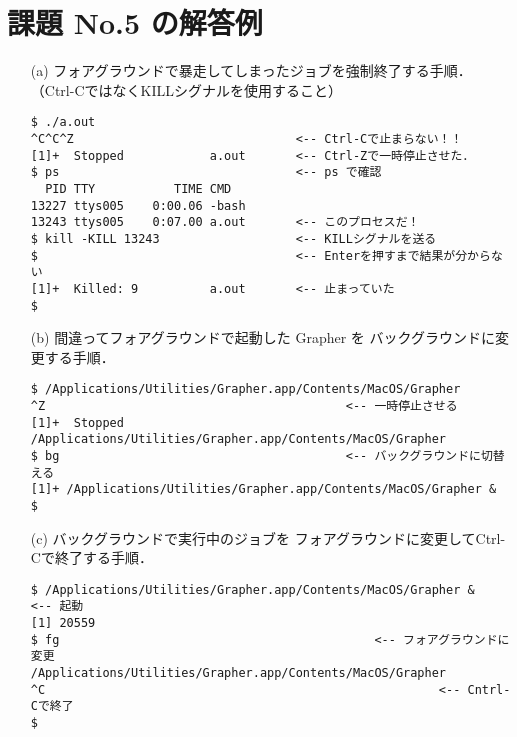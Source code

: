 \documentclass[a4j,twcolumn,11pt,nomag]{ltjarticle}      %
\begin{document}
\onecolumn

\section*{課題 No.5 の解答例}
\begin{enumerate}
\item[(a)] フォアグラウンドで暴走してしまったジョブを強制終了する手順．
（Ctrl-CではなくKILLシグナルを使用すること）

\begin{lstlisting}
$ ./a.out
^C^C^Z                               <-- Ctrl-Cで止まらない！！
[1]+  Stopped            a.out       <-- Ctrl-Zで一時停止させた．
$ ps                                 <-- ps で確認
  PID TTY           TIME CMD
13227 ttys005    0:00.06 -bash
13243 ttys005    0:07.00 a.out       <-- このプロセスだ！
$ kill -KILL 13243                   <-- KILLシグナルを送る
$                                    <-- Enterを押すまで結果が分からない
[1]+  Killed: 9          a.out       <-- 止まっていた
$
\end{lstlisting}

\item[(b)] 間違ってフォアグラウンドで起動した Grapher を
バックグラウンドに変更する手順．

\begin{lstlisting}
$ /Applications/Utilities/Grapher.app/Contents/MacOS/Grapher
^Z                                          <-- 一時停止させる
[1]+  Stopped  /Applications/Utilities/Grapher.app/Contents/MacOS/Grapher
$ bg                                        <-- バックグラウンドに切替える
[1]+ /Applications/Utilities/Grapher.app/Contents/MacOS/Grapher &
$
\end{lstlisting}

\item[(c)] バックグラウンドで実行中のジョブを
フォアグラウンドに変更してCtrl-Cで終了する手順．

\begin{lstlisting}
$ /Applications/Utilities/Grapher.app/Contents/MacOS/Grapher &    <-- 起動
[1] 20559
$ fg                                            <-- フォアグラウンドに変更
/Applications/Utilities/Grapher.app/Contents/MacOS/Grapher
^C                                                       <-- Cntrl-Cで終了
$
\end{lstlisting}
\end{enumerate}
\end{document}

